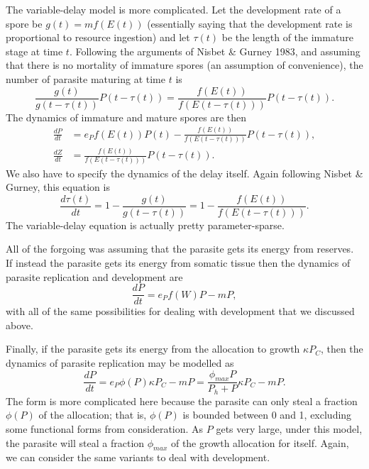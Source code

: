 \documentclass[12pt,reqno,final,pdftex]{amsart}\usepackage[]{graphicx}\usepackage[]{color}
\theoremstyle{plain}
\numberwithin{equation}{part}
\begin{document}
The variable-delay model is more complicated.
Let the development rate of a spore be $g(t) = m f(E(t))$ (essentially saying that the development rate is proportional to resource ingestion) and let $\tau(t)$ be the length of the immature stage at time $t$.
Following the arguments of Nisbet \& Gurney 1983, and assuming that there is no mortality of immature spores (an assumption of convenience), the number of parasite maturing at time $t$ is
\begin{equation}
\frac{g(t)}{g(t-\tau(t))}P(t-\tau(t)) = \frac{f(E(t))}{f(E(t-\tau(t)))}P(t-\tau(t)).
\end{equation}
The dynamics of immature and mature spores are then
\begin{align}
\frac{dP}{dt} &= e_P f(E(t)) P(t) - \frac{f(E(t))}{f(E(t-\tau(t)))}P(t-\tau(t)), \\
\frac{dZ}{dt} &= \frac{f(E(t))}{f(E(t-\tau(t)))}P(t-\tau(t)).
\end{align}
We also have to specify the dynamics of the delay itself.
Again following Nisbet \& Gurney, this equation is
\begin{equation}
\frac{d\tau(t)}{dt} = 1 - \frac{g(t)}{g(t-\tau(t))} = 1 - \frac{f(E(t))}{f(E(t-\tau(t)))}.
\end{equation}
The variable-delay equation is actually pretty parameter-sparse.

All of the forgoing was assuming that the parasite gets its energy from reserves.
If instead the parasite gets its energy from somatic tissue then the dynamics of parasite replication and development are
\begin{equation}
\frac{dP}{dt} = e_P f(W) P - m P,
\end{equation}
with all of the same possibilities for dealing with development that we discussed above.

Finally, if the parasite gets its energy from the allocation to growth $\kappa P_C$, then the dynamics of parasite replication may be modelled as
\begin{equation}
\frac{dP}{dt} = e_P \phi(P) \kappa P_C - m P = \frac{\phi_{max} P}{P_h + P} \kappa P_C - m P.
\end{equation}
The form is more complicated here because the parasite can only steal a fraction $\phi(P)$ of the allocation; that is, $\phi(P)$ is bounded between 0 and 1, excluding some functional forms from consideration.
As $P$ gets very large, under this model, the parasite will steal a fraction $\phi_{max}$ of the growth allocation for itself.
Again, we can consider the same variants to deal with development.
\end{document}
